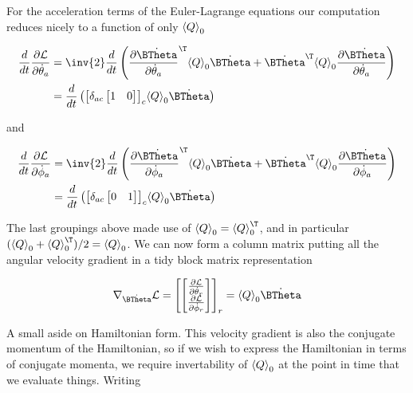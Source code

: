 For the acceleration terms of the Euler-Lagrange equations our computation reduces nicely to a function of only ${\left\langle{{Q}}\right\rangle}_{0}$

\begin{align*}
\frac{d}{dt} \PD{\dot{\theta}_a}{\LL}
&=
\inv{2} \frac{d}{dt} 
\left(
\PD{\dot{\theta}_a}{\dot{\BTheta}}^\T
\gpgradezero{Q} 
\dot{\BTheta}
+
\dot{\BTheta}^\T
\gpgradezero{Q} 
\PD{\dot{\theta}_a}{\dot{\BTheta}}
\right)  \\
&=
\frac{d}{dt} \left(
{\begin{bmatrix}
\delta_{ac}
\begin{bmatrix}
1 & 0
\end{bmatrix}
\end{bmatrix}}_c
\gpgradezero{Q} 
\dot{\BTheta}
\right) 
\end{align*}

and

\begin{align*}
\frac{d}{dt} \PD{\dot{\phi}_a}{\LL}
&=
\inv{2} \frac{d}{dt} 
\left(
\PD{\dot{\phi}_a}{\dot{\BTheta}}^\T
\gpgradezero{Q} 
\dot{\BTheta}
+
\dot{\BTheta}^\T
\gpgradezero{Q} 
\PD{\dot{\phi}_a}{\dot{\BTheta}}
\right)  \\
&=
\frac{d}{dt} \left(
{\begin{bmatrix}
\delta_{ac}
\begin{bmatrix}
0 & 1
\end{bmatrix}
\end{bmatrix}}_c
\gpgradezero{Q} 
\dot{\BTheta}
\right) 
\end{align*}

The last groupings above made use of $\gpgradezero{Q} = \gpgradezero{Q}^\T$, and in particular $(\gpgradezero{Q} + \gpgradezero{Q}^\T)/2 = \gpgradezero{Q}$.  We can now form a column matrix putting all the angular velocity gradient in a tidy block matrix representation

\begin{align}\label{eqn:multiPendulumSpherical2:boo22}
\grad_{\dot{\BTheta}} \LL = 
{\begin{bmatrix}
\begin{bmatrix}
\PD{\dot{\theta}_r}{\LL} \\
\PD{\dot{\phi}_r}{\LL} \\
\end{bmatrix}
\end{bmatrix}}_r = \gpgradezero{Q} \dot{\BTheta}
\end{align}

A small aside on Hamiltonian form.  This velocity gradient is also the conjugate momentum of the Hamiltonian, so if we wish to express the Hamiltonian in terms of conjugate momenta, we require invertability of ${\left\langle{{Q}}\right\rangle}_{0}$ at the point in time that we evaluate things.  Writing

